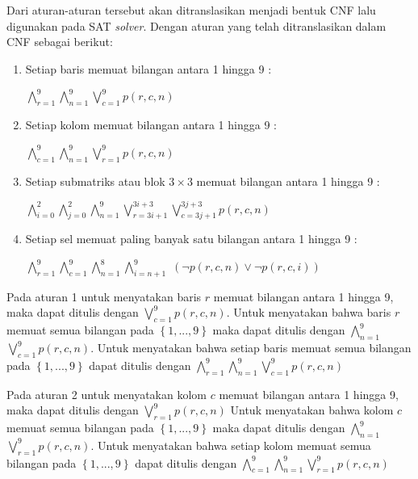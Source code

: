 Dari aturan-aturan tersebut akan ditranslasikan menjadi bentuk CNF lalu digunakan pada SAT \textit{solver}. Dengan aturan yang telah ditranslasikan dalam CNF sebagai berikut:

\begin{enumerate}
	\item Setiap baris memuat bilangan antara 1 
	hingga 9 : 
	
	$\bigwedge_{r=1}^{9}$$\bigwedge_{n=1}^{9}$$\bigvee_{c=1}^{9}$$p\left(r,c,n\right)$
	
	\item Setiap kolom memuat bilangan antara 1 hingga 9 : 
	
	$\bigwedge_{c=1}^{9}$$\bigwedge_{n=1}^{9}$$\bigvee_{r=1}^{9}$$p\left(r,c,n\right)$
	
	\item Setiap submatriks atau blok $3 \times 3$
	memuat bilangan antara 1 hingga 9 : 
	
	$\bigwedge_{i=0}^{2}$$\bigwedge_{j=0}^{2}$$\bigwedge_{n=1}^{9}$$\bigvee_{r=3i+1}^{3i+3}$$\bigvee_{c=3j+1}^{3j+3}$$p\left(r,c,n\right)$
	
	\item Setiap sel memuat paling banyak satu bilangan antara 1 hingga 9 : 
	
	$\bigwedge_{r=1}^{9}$$\bigwedge_{c=1}^{9}$$\bigwedge_{n=1}^{8}$$\bigwedge_{i=n+1}^{9}$
	$\left(\neg p\left(r,c,n\right)\vee\neg p\left(r,c,i\right)\right)$
	
\end{enumerate}


Pada aturan 1 untuk menyatakan baris $r$ memuat bilangan antara 1 hingga 9, maka dapat ditulis dengan  $\bigvee_{c=1}^{9}$$p\left(r,c,n\right)$. Untuk menyatakan bahwa baris $r$ memuat semua bilangan pada $\left\{1,...,9\right\}$ maka dapat ditulis dengan $\bigwedge_{n=1}^{9}$$\bigvee_{c=1}^{9}$$p\left(r,c,n\right)$. Untuk menyatakan bahwa setiap baris memuat semua bilangan pada $\left\{1,...,9\right\}$ dapat ditulis dengan $\bigwedge_{r=1}^{9}$$\bigwedge_{n=1}^{9}$$\bigvee_{c=1}^{9}$$p\left(r,c,n\right)$

Pada aturan 2  untuk menyatakan kolom $c$ memuat bilangan antara 1 hingga 9, maka dapat ditulis dengan  $\bigvee_{r=1}^{9}$$p\left(r,c,n\right)$
Untuk menyatakan bahwa kolom $c$ memuat semua bilangan pada $\left\{1,...,9\right\}$ maka dapat ditulis dengan $\bigwedge_{n=1}^{9}$$\bigvee_{r=1}^{9}$$p\left(r,c,n\right)$. Untuk menyatakan bahwa setiap kolom memuat semua bilangan pada $\left\{1,...,9\right\}$ dapat ditulis dengan $\bigwedge_{c=1}^{9}$$\bigwedge_{n=1}^{9}$$\bigvee_{r=1}^{9}$$p\left(r,c,n\right)$
 
